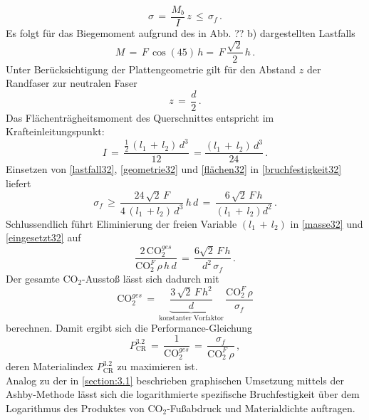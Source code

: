 \begin{equation}\label{bruchfestigkeit32}
\sigma\,=\,\frac{M_b}{I}\,z\,\le\,\sigma_f\,.
\end{equation}
Es folgt für das Biegemoment aufgrund des in Abb. ?? b) dargestellten Lastfalls
\begin{equation}\label{lastfall32}
M\,=\,F\,\cos(45)\,h=\,F\,\frac{\sqrt{2}}{2}\,h\,.
\end{equation}
Unter Berücksichtigung der Plattengeometrie gilt für den Abstand $z$ der Randfaser zur neutralen Faser
\begin{equation}\label{geometrie32}
z\,=\,\frac{d}{2}\,.
\end{equation}
Das Flächenträgheitsmoment des Querschnittes entspricht im Krafteinleitungspunkt:
\begin{equation}\label{flächen32}
I\,=\,\frac{\frac{1}{2}\,(l_1\,+\,l_2)\,d^3}{12}\,=\frac{(l_1\,+\,l_2)\,d^3}{24}\,.
\end{equation}
Einsetzen von \ref{lastfall32}, \ref{geometrie32} und \ref{flächen32} in \ref{bruchfestigkeit32} liefert
\begin{equation}\label{eingesetzt32}
\sigma_f\,\ge\,\frac{24\,\sqrt{2}\,F}{4\,(l_1\,+l_2)\,d^3}\,h\,d\,=\,\frac{6\,\sqrt{2}\,F\,h}{(l_1\,+\,l_2)d^2}\,.
\end{equation}
Schlussendlich führt Eliminierung der freien Variable $(l_1\,+\,l_2)$ in \ref{masse32} und \ref{eingesetzt32} auf
\begin{equation}
\frac{2\,\text{CO}_2^{ges}}{\text{CO}_2^F\,\rho\,h\,d}\,=\,\frac{6\sqrt{2}\,F\,h}{d^2\,\sigma_f}\,.
\end{equation}
Der gesamte CO$_2$-Ausstoß lässt sich dadurch mit
\begin{equation}
\text{CO}_2^{ges}\,=\,\underbrace{\frac{3\,\sqrt{2}\,F\,h^2}{d}}_{\text{konstanter Vorfaktor}}\,\frac{\text{CO}_2^F\,\rho}{\sigma_f}
\end{equation}
berechnen.
Damit ergibt sich die Performance-Gleichung
\begin{equation} \label{zielfkt32}
P_{\text{CR}}^{3.2}\,=\,\frac{1}{\text{CO}_2^{ges}}\,=\,\frac{\sigma_f}{\text{CO}_2^F\,\rho}\,,
\end{equation}
deren Materialindex $P_{\text{CR}}^{3.2}$ zu maximieren ist.\\
Analog zu der in \ref{section:3.1} beschrieben graphischen Umsetzung mittels der Ashby-Methode lässt sich die logarithmierte spezifische Bruchfestigkeit über dem Logarithmus des Produktes von CO$_2$-Fußabdruck und Materialdichte auftragen.\\
